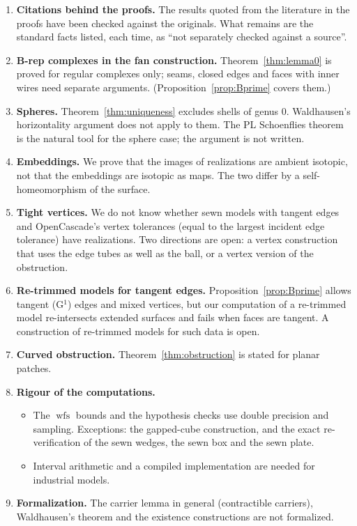 \documentclass[preprint,12pt]{elsarticle}
\theoremstyle{definition}
\theoremstyle{remark}
\newcommand{\wfs}{\operatorname{wfs}}
\begin{document}
\begin{enumerate}
\item \textbf{Citations behind the proofs.} The results quoted from the literature in the proofs have been checked
against the originals. What remains are the standard facts listed, each time, as ``not separately checked against a
source''.
\item \textbf{B-rep complexes in the fan construction.} Theorem~\ref{thm:lemma0} is proved for regular complexes only;
seams, closed edges and faces with inner wires need separate arguments. (Proposition~\ref{prop:Bprime} covers them.)
\item \textbf{Spheres.} Theorem~\ref{thm:uniqueness} excludes shells of genus $0$. Waldhausen's horizontality
argument does not apply to them. The PL Schoenflies theorem~\cite[Thm.~17.12]{Moise77} is the natural tool for the sphere
case; the argument is not written.
\item \textbf{Embeddings.} We prove that the images of realizations are ambient isotopic, not that the embeddings
are isotopic as maps. The two differ by a self-homeomorphism of the surface.
\item \textbf{Tight vertices.} We do not know whether sewn models with tangent edges and OpenCascade's vertex
tolerances (equal to the largest incident edge tolerance) have realizations. Two directions are open: a vertex
construction that uses the edge tubes as well as the ball, or a vertex version of the obstruction.
\item \textbf{Re-trimmed models for tangent edges.} Proposition~\ref{prop:Bprime} allows tangent (G$^1$) edges and mixed
vertices, but our computation of a re-trimmed model re-intersects extended surfaces and fails when faces are tangent. A
construction of re-trimmed models for such data is open.
\item \textbf{Curved obstruction.} Theorem~\ref{thm:obstruction} is stated for planar patches.
\item \textbf{Rigour of the computations.}
  \begin{itemize}
  \item The $\wfs$ bounds and the hypothesis checks use double precision and sampling. Exceptions: the gapped-cube
  construction, and the exact re-verification of the sewn wedges, the sewn box and the sewn plate.
  \item Interval arithmetic and a compiled implementation are needed for industrial models.
  \end{itemize}
\item \textbf{Formalization.} The carrier lemma in general (contractible carriers), Waldhausen's theorem and the
existence constructions are not formalized.
\end{enumerate}
\end{document}
